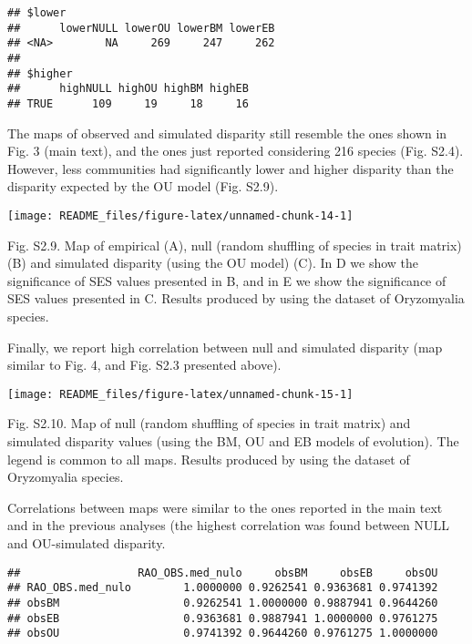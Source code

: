 \documentclass[
]{article}
\begin{document}
\begin{verbatim}
## $lower
##      lowerNULL lowerOU lowerBM lowerEB
## <NA>        NA     269     247     262
## 
## $higher
##      highNULL highOU highBM highEB
## TRUE      109     19     18     16
\end{verbatim}

The maps of observed and simulated disparity still resemble the ones
shown in Fig. 3 (main text), and the ones just reported considering 216
species (Fig. S2.4). However, less communities had significantly lower
and higher disparity than the disparity expected by the OU model (Fig.
S2.9).

\begin{center}\texttt{[image: README\_files/figure-latex/unnamed-chunk-14-1]} \end{center}

Fig. S2.9. Map of empirical (A), null (random shuffling of species in
trait matrix) (B) and simulated disparity (using the OU model) (C). In D
we show the significance of SES values presented in B, and in E we show
the significance of SES values presented in C. Results produced by using
the dataset of Oryzomyalia species.

Finally, we report high correlation between null and simulated disparity
(map similar to Fig. 4, and Fig. S2.3 presented above).

\begin{center}\texttt{[image: README\_files/figure-latex/unnamed-chunk-15-1]} \end{center}

Fig. S2.10. Map of null (random shuffling of species in trait matrix)
and simulated disparity values (using the BM, OU and EB models of
evolution). The legend is common to all maps. Results produced by using
the dataset of Oryzomyalia species.

Correlations between maps were similar to the ones reported in the main
text and in the previous analyses (the highest correlation was found
between NULL and OU-simulated disparity.

\begin{verbatim}
##                  RAO_OBS.med_nulo     obsBM     obsEB     obsOU
## RAO_OBS.med_nulo        1.0000000 0.9262541 0.9363681 0.9741392
## obsBM                   0.9262541 1.0000000 0.9887941 0.9644260
## obsEB                   0.9363681 0.9887941 1.0000000 0.9761275
## obsOU                   0.9741392 0.9644260 0.9761275 1.0000000
\end{verbatim}
\end{document}
